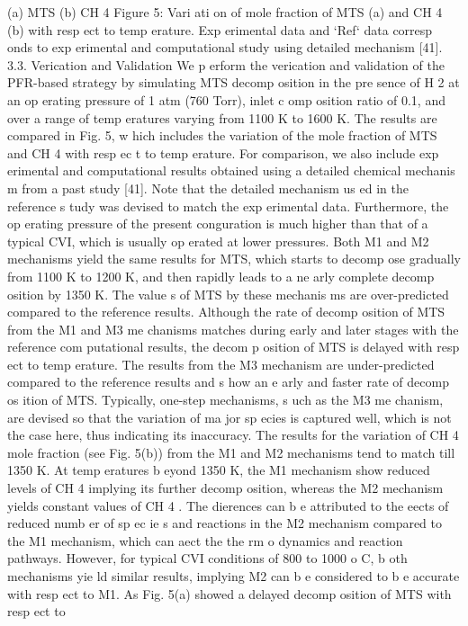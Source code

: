 \documentclass[10pt, letterpaper]{article}
\begin{document}
(a) MTS
(b) CH
4
Figure 5: Vari ati on of mole fraction of MTS (a) and CH
4
(b) with resp ect to temp erature. Exp erimental data and `Ref` data
corresp onds to exp erimental and computational study using detailed mechanism [41].
3.3. Verication and Validation
We p erform the verication and validation of the PFR-based strategy by simulating MTS decomp osition
in the pre sence of H
2
at an op erating pressure of 1 atm (760 Torr), inlet c omp osition ratio of 0.1, and over a
range of temp eratures varying from 1100 K to 1600 K. The results are compared in Fig. 5, w hich includes the
variation of the mole fraction of MTS and CH
4
with resp ec t to temp erature. For comparison, we also include
exp erimental and computational results obtained using a detailed chemical mechanis m from a past study
[41]. Note that the detailed mechanism us ed in the reference s tudy was devised to match the exp erimental
data. Furthermore, the op erating pressure of the present conguration is much higher than that of a typical
CVI, which is usually op erated at lower pressures.
Both M1 and M2 mechanisms yield the same results for MTS, which starts to decomp ose gradually
from 1100 K to 1200 K, and then rapidly leads to a ne arly complete decomp osition by 1350 K. The value s
of MTS by these mechanis ms are over-predicted compared to the reference results. Although the rate of
decomp osition of MTS from the M1 and M3 me chanisms matches during early and later stages with the
reference com putational results, the decom p osition of MTS is delayed with resp ect to temp erature. The
results from the M3 mechanism are under-predicted compared to the reference results and s how an e arly
and faster rate of decomp os ition of MTS. Typically, one-step mechanisms, s uch as the M3 me chanism, are
devised so that the variation of ma jor sp ecies is captured well, which is not the case here, thus indicating its
inaccuracy.
The results for the variation of CH
4
mole fraction (see Fig. 5(b)) from the M1 and M2 mechanisms tend to
match till 1350 K. At temp eratures b eyond 1350 K, the M1 mechanism show reduced levels of CH
4
implying
its further decomp osition, whereas the M2 mechanism yields constant values of CH
4
. The dierences can
b e attributed to the eects of reduced numb er of sp ec ie s and reactions in the M2 mechanism compared
to the M1 mechanism, which can aect the the rm o dynamics and reaction pathways. However, for typical
CVI conditions of 800 to 1000
o
C, b oth mechanisms yie ld similar results, implying M2 can b e considered
to b e accurate with resp ect to M1. As Fig. 5(a) showed a delayed decomp osition of MTS with resp ect to
\end{document}
